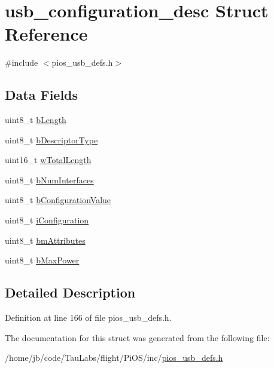 \hypertarget{structusb__configuration__desc}{\section{usb\-\_\-configuration\-\_\-desc \-Struct \-Reference}
\label{structusb__configuration__desc}
}


{\ttfamily \#include $<$pios\-\_\-usb\-\_\-defs.\-h$>$}

\subsection*{\-Data \-Fields}
\begin{DoxyCompactItemize}
\item 
uint8\-\_\-t \hyperlink{group___p_i_o_s___u_s_b___d_e_f_s_ga37130504779d534ee26038329c6cf556}{b\-Length}
\item 
uint8\-\_\-t \hyperlink{group___p_i_o_s___u_s_b___d_e_f_s_gaa3581ef511398a39f3dba3517e45207b}{b\-Descriptor\-Type}
\item 
uint16\-\_\-t \hyperlink{group___p_i_o_s___u_s_b___d_e_f_s_ga5d8ee63135423fa6ee5de728aa2c4ffd}{w\-Total\-Length}
\item 
uint8\-\_\-t \hyperlink{group___p_i_o_s___u_s_b___d_e_f_s_ga12405f84f025bf39bd4261c0ec16b709}{b\-Num\-Interfaces}
\item 
uint8\-\_\-t \hyperlink{group___p_i_o_s___u_s_b___d_e_f_s_ga3a0621b62628b16a9f6bb18aace6a2bb}{b\-Configuration\-Value}
\item 
uint8\-\_\-t \hyperlink{group___p_i_o_s___u_s_b___d_e_f_s_ga2cc988492163e6ca3d548cf632fbf01d}{i\-Configuration}
\item 
uint8\-\_\-t \hyperlink{group___p_i_o_s___u_s_b___d_e_f_s_ga76649c01c303d92feff0e4c3767d02ac}{bm\-Attributes}
\item 
uint8\-\_\-t \hyperlink{group___p_i_o_s___u_s_b___d_e_f_s_gaf57a5d3898006764248c6c40130c3d90}{b\-Max\-Power}
\end{DoxyCompactItemize}


\subsection{\-Detailed \-Description}


\-Definition at line 166 of file pios\-\_\-usb\-\_\-defs.\-h.



\-The documentation for this struct was generated from the following file\-:\begin{DoxyCompactItemize}
\item 
/home/jb/code/\-Tau\-Labs/flight/\-Pi\-O\-S/inc/\hyperlink{pios__usb__defs_8h}{pios\-\_\-usb\-\_\-defs.\-h}\end{DoxyCompactItemize}
